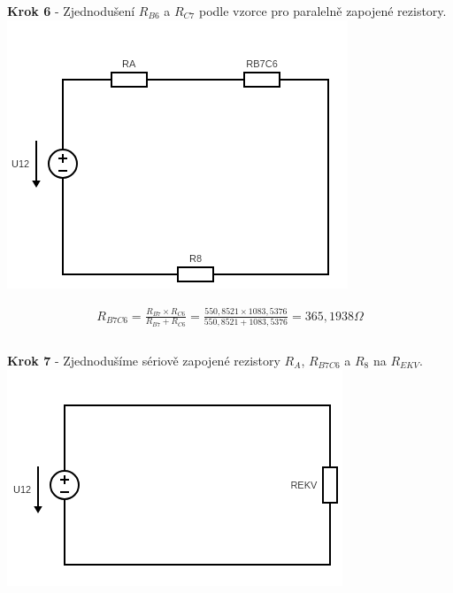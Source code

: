 \newpage

\begin{center}
\textbf{Krok 6} - Zjednodušení $R_{B6}$ a $R_{C7}$ podle vzorce pro paralelně zapojené rezistory.
\includegraphics[scale=0.6,keepaspectratio]{fig/Pr1_steps/Pr1_step06.png} \\
\end{center}
\vspace{-0.3cm}

\begin{gather*}
R_{B7C6} = \frac{R_{B7} \times R_{C6}}{R_{B7} + R_{C6}} = \frac{550,8521 \times 1083,5376}{550,8521 + 1083,5376} = 365,1938 \Omega \\\\
\end{gather*}

\begin{center}
\textbf{Krok 7} - Zjednodušíme sériově zapojené rezistory $R_A$, $R_{B7C6}$ a $R_8$ na $R_{EKV}$.
\includegraphics[scale=0.6,keepaspectratio]{fig/Pr1_steps/Pr1_step07.png} \\
\end{center}
\vspace{-0.3cm}

